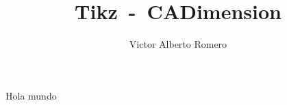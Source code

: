 \documentclass[12pt]{article}
\begin{document}
\title{\textbf{Tikz~-~CADimension}}
\author{Victor Alberto Romero}
\maketitle

Hola mundo
\end{document}
